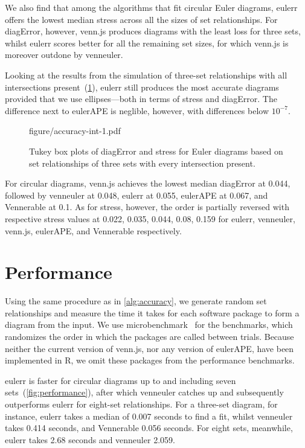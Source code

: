 \documentclass[
  oneside,
  openany,
  numbers=noendperiod,
  parskip=half,
  bibliography=totoc
]{scrbook}\usepackage[]{graphicx}\usepackage{xcolor}
\newcommand{\pkg}[1]{{\fontseries{b}\selectfont #1}}
\begin{document}
We also find that among the algorithms that fit circular Euler diagrams,
\pkg{eulerr} offers the lowest median stress across all the sizes of set
relationships. For diagError, however, \pkg{venn.js} produces diagrams with the
least loss for three sets, whilst \pkg{eulerr} scores better for all the remaining set sizes,
for which \pkg{venn.js} is moreover outdone by \pkg{venneuler}.



Looking at the results from the simulation of three-set relationships with
all intersections present~(\cref{fig:accuracy-int}), \pkg{eulerr} still
produces the most accurate diagrams provided that we use ellipses---both in
terms of stress and diagError. The
difference next to \pkg{eulerAPE} is neglible, however, with differences
below $10^{-7}$.

\begin{figure}[hbtp]
\caption{Tukey box plots of diagError and stress for Euler diagrams
based on set relationships of three sets with every
intersection present.\label{fig:accuracy-int}}
figure/accuracy-int-1.pdf
\end{figure}

For circular diagrams, \pkg{venn.js} achieves the lowest median diagError at
0.044, followed by \pkg{venneuler} at 0.048,
\pkg{eulerr} at 0.055, \pkg{eulerAPE} at 0.067,
and \pkg{Vennerable} at 0.1. As for stress, however, the order is
partially reversed with respective stress values at
0.022, 0.035, 0.044, 0.08,
0.159 for
\pkg{eulerr}, \pkg{venneuler}, \pkg{venn.js}, \pkg{eulerAPE}, and \pkg{Vennerable}
respectively.

\section{Performance}
\label{sec:performance}

Using the same procedure as in \cref{alg:accuracy}, we generate random set
relationships and measure the time it takes for each software package to form a
diagram from the input. We use \pkg{microbenchmark}~\citep{Ooms_2017} for the benchmarks,
which randomizes the order in which the packages are called between trials.
Because neither the current version of \pkg{venn.js}, nor any version of \pkg{eulerAPE},
have been implemented in R, we omit these packages from the
performance benchmarks.



\pkg{eulerr} is faster for circular diagrams up to and including seven
sets~(\cref{fig:performance}), after which \pkg{venneuler} catches
up and subsequently outperforms \pkg{eulerr} for eight-set relationships. For a three-set diagram,
for instance, \pkg{eulerr} takes a median of
0.007
seconds to find a fit, whilst \pkg{venneuler} takes 0.414
seconds, and \pkg{Vennerable} 0.056
seconds. For eight sets, meanwhile, \pkg{eulerr} takes
2.68
seconds and \pkg{venneuler} 2.059.
\end{document}
